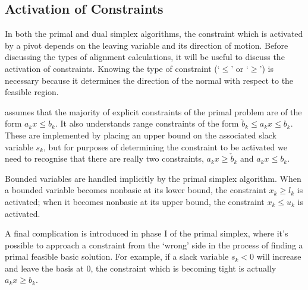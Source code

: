 \subsection{Activation of Constraints}

In both the primal and dual simplex algorithms, the constraint which is
activated by a pivot depends on the leaving variable and its direction of
motion.
Before discussing the types of alignment calculations, it will be useful to
discuss the activation of constraints.
Knowing the type of constraint (`$\leq$' or `$\geq$') is necessary because it
determines the direction of the normal with respect to the feasible region.

\dylp assumes that the majority of explicit constraints of the primal problem
are of the form $a_k x \leq b_k$.
It also understands range constraints of the form
$\check{b}_k \leq a_k x \leq b_k$.
These are implemented by placing an upper bound on the associated slack
variable $s_k$, but for purposes of determining the constraint to be activated
we need to recognise that there are really two
constraints, $a_k x \geq \check{b}_k$ and $a_k x \leq b_k$.

Bounded variables are handled implicitly by the primal simplex algorithm.
When a bounded variable becomes nonbasic at its lower bound, the constraint
$x_k \geq l_k$ is activated; when it becomes nonbasic at its upper bound,
the constraint $x_k \leq u_k$ is activated.

A final complication is introduced in phase I of the primal simplex, where
it's possible to approach a constraint from the `wrong' side in the process
of finding a primal feasible basic solution.
For example, if a slack variable $s_k < 0$ will increase and leave the basis
at 0, the constraint which is becoming tight is actually $a_k x \geq b_k$.

